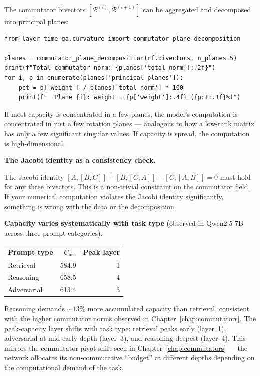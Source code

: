 \documentclass[11pt, twoside, openright]{memoir}
\newcommand{\bivec}[1]{\mathcal{B}^{(#1)}}  %
\numberwithin{equation}{chapter}
\begin{document}
The commutator bivectors $[\bivec{l}, \bivec{l+1}]$ can be aggregated
and decomposed into principal planes:

\begin{lstlisting}[caption={Capacity with plane decomposition}]
from layer_time_ga.curvature import commutator_plane_decomposition

planes = commutator_plane_decomposition(rf.bivectors, n_planes=5)
print(f"Total commutator norm: {planes['total_norm']:.2f}")
for i, p in enumerate(planes['principal_planes']):
    pct = p['weight'] / planes['total_norm'] * 100
    print(f"  Plane {i}: weight = {p['weight']:.4f} ({pct:.1f}%)")
\end{lstlisting}

If most capacity is concentrated in a few planes, the model's
computation is concentrated in just a few rotation planes --- analogous to how a low-rank matrix has only a few significant singular values.  If capacity is spread, the computation is
high-dimensional.

\begin{gabox}
\textbf{The Jacobi identity as a consistency check.}

The Jacobi identity $[A,[B,C]] + [B,[C,A]] + [C,[A,B]] = 0$ must hold
for any three bivectors.  This is a non-trivial constraint on the
commutator field.  If your numerical computation violates the Jacobi
identity significantly, something is wrong with the data or the
decomposition.
\end{gabox}

\begin{finding}
\textbf{Capacity varies systematically with task type}
(observed in Qwen2.5-7B across three prompt categories).

\medskip
\begin{center}
\renewcommand{\arraystretch}{1.3}\small
\begin{tabular}{@{} l r r @{}}
\toprule
\textbf{Prompt type} & $C_{\mathrm{acc}}$ & \textbf{Peak layer} \\
\midrule
Retrieval   & 584.9 & 1 \\
Reasoning   & 658.5 & 4 \\
Adversarial & 613.4 & 3 \\
\bottomrule
\end{tabular}
\end{center}

\medskip
Reasoning demands ${\sim}13\%$ more accumulated capacity than retrieval,
consistent with the higher commutator norms observed in
Chapter~\ref{chap:commutators}.  The peak-capacity layer shifts with
task type: retrieval peaks early (layer~1), adversarial at mid-early
depth (layer~3), and reasoning deepest (layer~4).  This mirrors the
commutator pivot shift seen in Chapter~\ref{chap:commutators} ---
the network allocates its non-commutative ``budget'' at different
depths depending on the computational demand of the task.
\end{finding}
\end{document}
